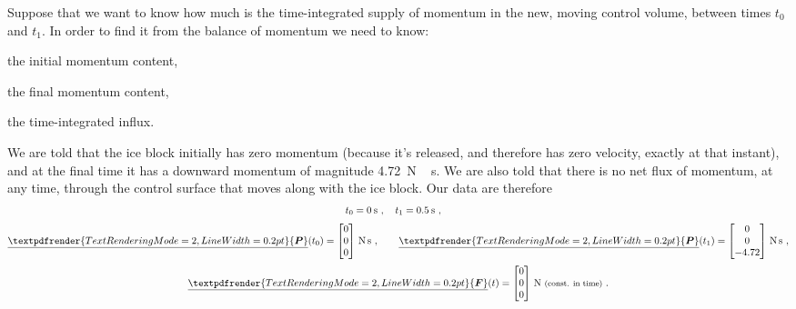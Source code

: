 \documentclass[a4paper,12pt,%
onecolumn,oneside,%
british%
]{memoir}
\renewcommand*{\bm}[1]{\textpdfrender{TextRenderingMode=2,LineWidth=0.2pt}{\boldsymbol{#1}}}
\renewcommand*{\|}[1][]{\nonscript\:#1\vert\nonscript\:\mathopen{}}
\newcommand*{\yti}{t_{0}}
\newcommand*{\ytf}{t_{1}}
\newcommand*{\yP}{\bm{P}}
\newcommand*{\yF}{\bm{F}}
\begin{document}
Suppose that we want to know how much is the time-integrated supply of momentum in the new, moving control volume, between times $\yti$ and $\ytf$. In order to find it from the balance of momentum we need to know:
\begin{enumerate*}[label=(\alph*)]
\item the initial momentum content,
\item the final momentum content,
\item the time-integrated influx.
\end{enumerate*}

We are told that the ice block initially has zero momentum (because it's released, and therefore has zero velocity, exactly at that instant), and at the final time it has a downward momentum of magnitude \qty{4.72}{N\,s}. We are also told that there is no net flux of momentum, at any time, through the control surface that moves along with the ice block. Our data are therefore
\begin{equation*}
  \begin{gathered}
    \yti=\qty{0}{s}\ ,\quad
    \ytf=\qty{0.5}{s}\ , \quad
    \\[\jot]
    \underline{\yP}(\yti)=\begin{bmatrix}0\\0\\0\end{bmatrix}\,\unit{N\,s}\ ,
    \qquad
    \underline{\yP}(\ytf)
    =\begin{bmatrix}0\\0\\\num{-4.72}\end{bmatrix}\,\unit{N\,s}\ ,
    \\[\jot]
    \underline{\yF}(t)
    =\begin{bmatrix}0\\0\\0\end{bmatrix}\,\unit{N}
    \ \text{\footnotesize(const. in time)} \ .
  \end{gathered}
\end{equation*}
\end{document}
